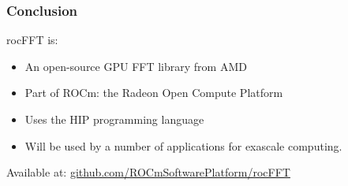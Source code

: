 \documentclass[10pt,aspectratio=169]{beamer}
\begin{document}
\begin{frame}[fragile]
  \frametitle{Conclusion}

  \begin{center}
    rocFFT is:
  \end{center}
  \bigskip
  \begin{itemize}
  \item An open-source GPU FFT library from AMD
  \medskip
  \item Part of ROCm: the Radeon Open Compute Platform
  \medskip
  \item Uses the HIP programming language
  \medskip
  \item Will be used by a number of applications for exascale computing.
  \end{itemize}

  \bigskip
  \begin{center}
    Available at: \url{github.com/ROCmSoftwarePlatform/rocFFT}
  \end{center}
  
\end{frame}
\end{document}
